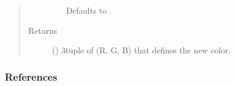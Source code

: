 \documentclass[letterpaper,10pt,english]{sphinxmanual}
\begin{document}
\begin{fulllineitems}
\begin{quote}
\begin{description}
\begin{itemize}
Defaults to .


\end{itemize}

\item[{Returns}] \leavevmode
{} () \textendash{} 3\sphinxhyphen{}tuple of (R, G, B) that defines the new color.

\end{description}\end{quote}
\subsubsection*{References}

\end{fulllineitems}

\end{document}
